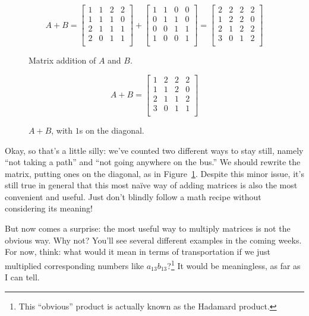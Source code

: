 \documentclass[../gatm.tex]{subfiles}
\begin{document}
\begin{figure}[h]
\begin{minipage}{0.57\textwidth}
$$A+B=\left[\begin{array}{cccc}
1 & 1 & 2 & 2 \\
1 & 1 & 1 & 0 \\
2 & 1 & 1 & 1 \\
2 & 0 & 1 & 1 \\
\end{array}\right] + \left[\begin{array}{cccc}
1 & 1 & 0 & 0 \\
0 & 1 & 1 & 0 \\
0 & 0 & 1 & 1 \\
1 & 0 & 0 & 1 \\
\end{array}\right] = \left[\begin{array}{cccc}
2 & 2 & 2 & 2 \\
1 & 2 & 2 & 0 \\
2 & 1 & 2 & 2 \\
3 & 0 & 1 & 2 \\
\end{array}\right]$$
\caption{Matrix addition of $A$ and $B$.}
\label{fig:mtrx_add}
\end{minipage}\hfill
\begin{minipage}{0.3\textwidth}
$$A+B=\left[\begin{array}{cccc}
1 & 2 & 2 & 2 \\
1 & 1 & 2 & 0 \\
2 & 1 & 1 & 2 \\
3 & 0 & 1 & 1 \\
\end{array}\right]$$
\caption{$A+B$, with $1$s on the diagonal.}
\label{fig:mtrx_replace}
\end{minipage}
\end{figure}

Okay, so that's a little silly: we've counted two different ways to stay still, namely ``not taking a path'' and ``not going anywhere on the bus.'' We should rewrite the matrix, putting ones on the diagonal, as in Figure~\ref{fig:mtrx_replace}. Despite this minor issue, it's still true in general that this most naïve way of adding matrices is also the most convenient and useful. Just don't blindly follow a math recipe without considering its meaning!

But now comes a surprise: the most useful way to multiply matrices is not the obvious way. Why not? You'll see several different examples in the coming weeks. For now, think: what would it mean in terms of transportation if we just multiplied corresponding numbers like $a_{13}b_{13}$?\footnote{This ``obvious'' product is actually known as the Hadamard product.} It would be meaningless, as far as I can tell.
\end{document}
